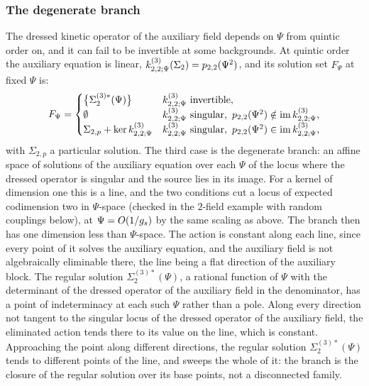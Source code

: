 \subsubsection{The degenerate branch}
\label{p:sec:sol:degenerate}


The dressed kinetic operator of the auxiliary field depends on $\Psi$ from quintic order on, and it can fail to be invertible at some backgrounds.
At quintic order the auxiliary equation is linear, $\kin{2}{\Psi}{3}(\Sigma_2) = \sprod{2}{2}(\Psi^2)$, and its solution set $F_\Psi$ at fixed $\Psi$ is:
\begin{equation}
  \label{p:eq:sol:degenerate}
  F_\Psi
    = \begin{cases}
        \big\{ \Sigma_2^{(3)*}(\Psi) \big\}
          & \kin{2}{\Psi}{3} \text{ invertible},
        \\
        \emptyset
          & \kin{2}{\Psi}{3} \text{ singular},
            \ \sprod{2}{2}(\Psi^2) \notin \operatorname{im} \kin{2}{\Psi}{3},
        \\
        \Sigma_{2, p} + \ker \kin{2}{\Psi}{3}
          & \kin{2}{\Psi}{3} \text{ singular},
            \ \sprod{2}{2}(\Psi^2) \in \operatorname{im} \kin{2}{\Psi}{3},
      \end{cases}
\end{equation}
with $\Sigma_{2, p}$ a particular solution.
The third case is the degenerate branch: an affine space of solutions of the auxiliary equation over each $\Psi$ of the locus where the dressed operator is singular and the source lies in its image.
For a kernel of dimension one this is a line, and the two conditions cut a locus of expected codimension two in $\Psi$-space (checked in the $2$-field example with random couplings below), at $\Psi = O(1 / g_s)$ by the same scaling as above.
The branch then has one dimension less than $\Psi$-space.
The action is constant along each line, since every point of it solves the auxiliary equation, and the auxiliary field is not algebraically eliminable there, the line being a flat direction of the auxiliary block.
The regular solution $\Sigma_2^{(3)*}(\Psi)$, a rational function of $\Psi$ with the determinant of the dressed operator of the auxiliary field in the denominator, has a point of indeterminacy at each such $\Psi$ rather than a pole.
Along every direction not tangent to the singular locus of the dressed operator of the auxiliary field, the eliminated action tends there to its value on the line, which is constant.
Approaching the point along different directions, the regular solution $\Sigma_2^{(3)*}(\Psi)$ tends to different points of the line, and sweeps the whole of it: the branch is the closure of the regular solution over its base points, not a disconnected family.

